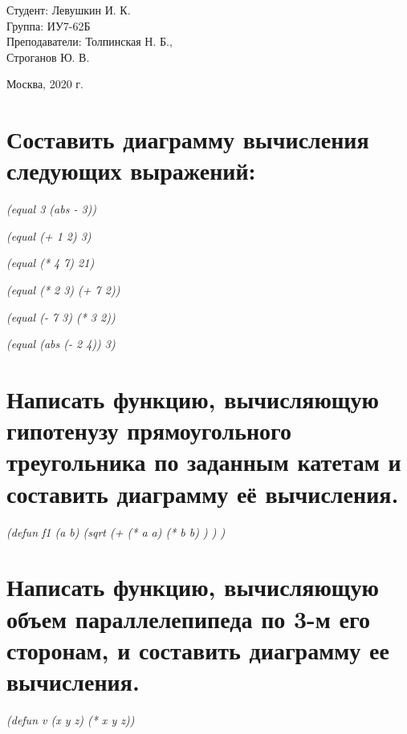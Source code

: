 \documentclass[a4paper,12pt]{article}
\begin{document}
	\vspace*{15mm} 	
	
	\large
	\begin{flushright}
		Студент: Левушкин И. К. \\
		Группа: ИУ7-62Б \\
		Преподаватели: Толпинская Н. Б., \\ Строганов Ю. В. \\
	\end{flushright}
	
	\vspace*{30mm}
	\begin{center}
		Москва, 2020 г.  
	\end{center}
	\thispagestyle{empty}
	
	
	\newpage
	
	\section{Составить диаграмму вычисления следующих выражений:}
	\textit{(equal 3 (abs - 3))}
	\vspace*{60mm} 
	
	\textit{(equal (+ 1 2) 3)}
	\vspace*{60mm} 
	
	\textit{(equal (* 4 7) 21)}
	\vspace*{60mm} 
	
	\textit{(equal (* 2 3) (+ 7 2))}
	\vspace*{60mm} 
	
	\textit{(equal (- 7 3) (* 3 2))}
	\vspace*{60mm} 
	
	\textit{(equal (abs (- 2 4)) 3)}
	\vspace*{60mm} 
	
	\newpage
	
	\section{Написать функцию, вычисляющую гипотенузу прямоугольного
треугольника по заданным катетам и составить диаграмму её вычисления.
	}
	\textit{(defun f1 (a b) (sqrt (+ (* a a) (* b b) ) ) )}
	\newpage

	\section{Написать функцию, вычисляющую объем параллелепипеда по 3-м его сторонам, и составить диаграмму ее вычисления.}
	\textit{(defun v (x y z) (* x y z))}
	\newpage
	
\end{document}
